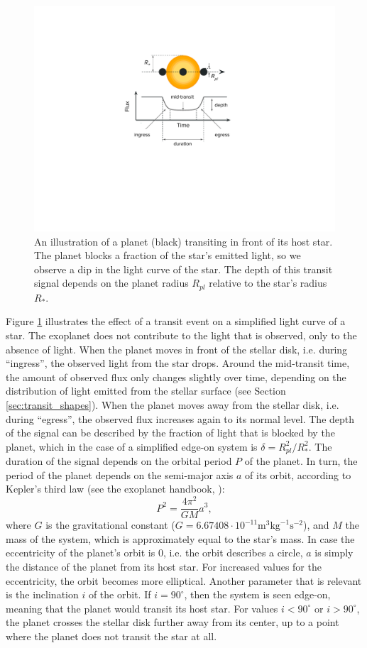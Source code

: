 \begin{figure}
    \centering
    \includegraphics[width=0.4\linewidth]{Background/Figures/transit_drawing.pdf}
    \caption{An illustration of a planet (black) transiting in front of its host star. The planet blocks a fraction of the star's emitted light, so we observe a dip in the light curve of the star. The depth of this transit signal depends on the planet radius $R_{pl}$ relative to the star's radius $R_*$.}
    \label{fig:transit}
\end{figure}

Figure \ref{fig:transit} illustrates the effect of a transit event on a simplified light curve of a star. The exoplanet does not contribute to the light that is observed, only to the absence of light. When the planet moves in front of the stellar disk, i.e. during ``ingress'', the observed light from the star drops. Around the mid-transit time, the amount of observed flux only changes slightly over time, depending on the distribution of light emitted from the stellar surface (see Section \ref{sec:transit_shapes}). When the planet moves away from the stellar disk, i.e. during ``egress'', the observed flux increases again to its normal level. The depth of the signal can be described by the fraction of light that is blocked by the planet, which in the case of a simplified edge-on system is $\delta = R_{pl}^2 / R_*^2$. The duration of the signal depends on the orbital period $P$ of the planet. In turn, the period of the planet depends on the semi-major axis $a$ of its orbit, according to Kepler's third law (see the exoplanet handbook, \cite{perryman2018exoplanet}):
\begin{equation}
    \label{eq:kepler}
    P^2 = \frac{4 \pi^2}{GM}  a^3,
\end{equation}
where $G$ is the gravitational constant ($G=6.67408 \cdot 10^{-11} \text{m}^3 \text{kg}^{-1} \text{s}^{-2}$), and $M$ the mass of the system, which is approximately equal to the star’s mass.
In case the eccentricity of the planet's orbit is 0, i.e. the orbit describes a circle, $a$ is simply the distance of the planet from its host star. For increased values for the eccentricity, the orbit becomes more elliptical. Another parameter that is relevant is the inclination $i$ of the orbit. If $i=90^\circ$, then the system is seen edge-on, meaning that the planet would transit its host star. For values $i < 90^\circ$ or $i > 90^\circ$, the planet crosses the stellar disk further away from its center, up to a point where the planet does not transit the star at all.

